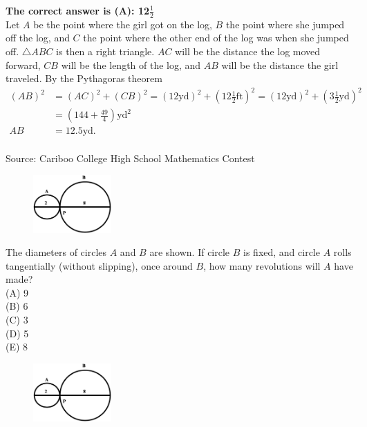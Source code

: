\documentclass{article}
\begin{document}
\textbf{The correct answer is (A): 12$\frac{1}{2}$}\\[1 ex]
Let $A$ be the point where the girl got on the log, $B$ the point where she jumped off the log, and $C$ the point where the other end of the log was when she jumped off. $\triangle ABC$ is then a right triangle. $AC$ will be the distance the log moved forward, $CB$ will be the length of the log, and $AB$ will be the distance the girl traveled. By the Pythagoras theorem
\begin{align*}
(AB)^{2}&=(AC)^{2}+(CB)^{2}=(12\textrm{yd})^{2}+(12\frac{1}{2}\textrm{ft})^{2}=(12\textrm{yd})^{2}+(3\frac{1}{2}\textrm{yd})^{2}\\
&=(144+\frac{49}{4})\textrm{yd}^{2}\\
AB&=12.5\textrm{yd}.
\end{align*}
\\[5 ex]

\scriptsize
Source: Cariboo College High School Mathematics Contest

\normalsize
\begin{figure}
	\includegraphics[width=30mm,viewport=74 194 500 512]{CCSPR74-10pic.eps}
\end{figure}
The diameters of circles $A$ and $B$ are shown. If circle $B$ is fixed, and circle $A$ rolls tangentially (without slipping), once around $B$, how many revolutions will $A$ have made?\\
(A) 9\\
(B) 6\\
(C) 3\\
(D) 5\\
(E) 8\\

\begin{figure}
	\includegraphics[width=30mm,viewport=74 194 500 512]{CCSPR74-10pic.eps}
\end{figure}
\end{document}
